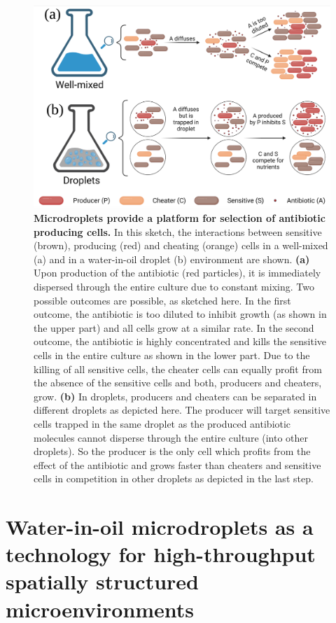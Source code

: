 \begin{figure}
\includegraphics[width=\linewidth]{graphics/2025_09_30_droplets_fig1.png}

\caption{\textbf{Microdroplets provide a platform for selection of antibiotic producing cells.} In this sketch, the interactions between sensitive (brown), producing (red) and cheating (orange) cells in a well-mixed (a) and in a water-in-oil droplet (b) environment are shown. \textbf{(a)} Upon production of the antibiotic (red particles), it is immediately dispersed through the entire culture due to constant mixing. Two possible outcomes are possible, as sketched here. In the first outcome, the antibiotic is too diluted to inhibit growth (as shown in the upper part) and all cells grow at a similar rate. In the second outcome, the antibiotic is highly concentrated and kills the sensitive cells in the entire culture as shown in the lower part. Due to the killing of all sensitive cells, the cheater cells can equally profit from the absence of the sensitive cells and both, producers and cheaters, grow. \textbf{(b)} In droplets, producers and cheaters can be separated in different droplets as depicted here. The producer will target sensitive cells trapped in the same droplet as the produced antibiotic molecules cannot disperse through the entire culture (into other droplets). So the producer is the only cell which profits from the effect of the antibiotic and grows faster than cheaters and sensitive cells in competition in other droplets as depicted in the last step.}
\label{fig:intro_droplets_idea}
\end{figure}

\section{Water-in-oil microdroplets as a technology for high-throughput spatially structured microenvironments}

